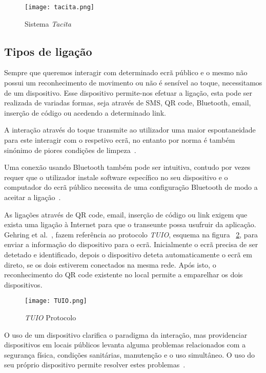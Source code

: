 \begin{figure}[ht]
\centering
\texttt{[image: tacita.png]}
\caption[Sistema \textit{Tacita}] {Sistema \textit{Tacita} ~\cite{Davies2012b}}
\label{fig:tacita}
\end{figure}

\subsection{Tipos de ligação}

Sempre que queremos interagir com determinado ecrã público e o mesmo não possui um reconhecimento de movimento ou não é sensível ao toque, necessitamos de um dispositivo. Esse dispositivo permite-nos efetuar a ligação, esta pode ser realizada de variadas formas, seja através de SMS, QR code, Bluetooth, email, inserção de código ou acedendo a determinado link.

A interação através do toque transmite ao utilizador uma maior espontaneidade para este interagir com o respetivo ecrã, no entanto por norma é também sinónimo de piores condições de limpeza~\cite{Ballagas}.

Uma conexão usando Bluetooth também pode ser intuitiva, contudo por vezes requer que o utilizador instale software específico no seu dispositivo e o computador do ecrã público necessita de uma configuração Bluetooth de modo a aceitar a ligação~\cite{Ballagas}.

As ligações através de QR code, email, inserção de código ou link exigem que exista uma ligação à Internet para que o transeunte possa usufruir da aplicação. 
Gehring et al.~\cite{Gehring}, fazem referência ao protocolo \textit{TUIO}, esquema na figura ~\ref{fig:TUIO}, para enviar a informação do dispositivo para o ecrã. Inicialmente o ecrã precisa de ser detetado e identificado, depois o dispositivo deteta automaticamente o ecrã em direto, se os dois estiverem conectados na mesma rede. Após isto, o reconhecimento do QR code existente no local permite a emparelhar os dois dispositivos.

\begin{figure}[ht]
\centering
\texttt{[image: TUIO.png]}
\caption[textit{TUIO} Protocolo] {\textit{TUIO} Protocolo ~\cite{Gehring}}
\label{fig:TUIO}
\end{figure}


O uso de um dispositivo clarifica o paradigma da interação, mas providenciar dispositivos em locais públicos levanta alguma problemas relacionados com a segurança física, condições sanitárias, manutenção e o uso simultâneo. O uso do seu próprio dispositivo permite resolver estes problemas~\cite{Ballagas}.

